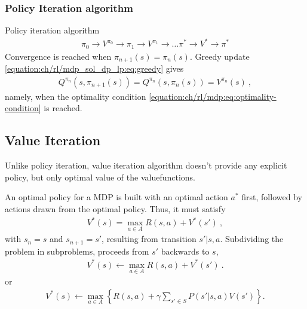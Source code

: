 \documentclass[letterpaper,10pt,english]{jupyterBook}
\begin{document}
\subsubsection{Policy Iteration algorithm}
\label{\detokenize{ch/rl/mdp_sol_dp_lp:policy-iteration-algorithm}}\label{\detokenize{ch/rl/mdp_sol_dp_lp:rl-mdp-sol-dp-pi-algorithm}}
\sphinxAtStartPar
Policy iteration algorithm
\begin{equation*}
\begin{split}\pi_0 \rightarrow V^{\pi_0} \rightarrow \pi_1 \rightarrow V^{\pi_1} \rightarrow \dots \pi^* \rightarrow V^* \rightarrow \pi^*\end{split}
\end{equation*}
\sphinxAtStartPar
Convergence is reached when \(\pi_{n+1}(s) = \pi_{n}(s)\). Greedy update \eqref{equation:ch/rl/mdp_sol_dp_lp:eq:greedy} gives
\begin{equation*}
\begin{split}Q^{\pi_{n}}(s, \pi_{n+1}(s)) = Q^{\pi_n}(s, \pi_n(s)) = V^{\pi_n}(s) \ ,\end{split}
\end{equation*}
\sphinxAtStartPar
namely, when the optimality condition \eqref{equation:ch/rl/mdp:eq:optimality-condition} is reached.


\subsection{Value Iteration}
\label{\detokenize{ch/rl/mdp_sol_dp_lp:value-iteration}}\label{\detokenize{ch/rl/mdp_sol_dp_lp:rl-mdp-sol-dp-vi}}
\sphinxAtStartPar
Unlike policy iteration, value iteration algorithm doesn’t provide any explicit policy, but only optimal value of the value\sphinxhyphen{}functions.

\sphinxAtStartPar
An optimal policy for a MDP is built with an optimal action \(a^*\) first, followed by actions drawn from the optimal policy. Thus, it must satisfy
\begin{equation*}
\begin{split}V^*(s) = \max_{a \in A} R(s,a) + V^*(s') \ ,\end{split}
\end{equation*}
\sphinxAtStartPar
with \(s_{n} = s\) and \(s_{n+1} = s'\), resulting from transition \(s'|s,a\). Subdividing the problem in sub\sphinxhyphen{}problems,  proceeds from \(s'\) backwards to \(s\),
\begin{equation*}
\begin{split}V^*(s) \leftarrow \max_{a \in A} R(s,a) + V^*(s') \ .\end{split}
\end{equation*}
\sphinxAtStartPar
or
\begin{equation*}
\begin{split}V^*(s) \leftarrow \max_{a \in A} \left\{ R(s,a) + \gamma \sum_{s' \in S} P(s'|s,a) V(s') \right\} .\end{split}
\end{equation*}
\end{document}
